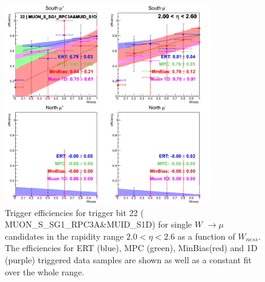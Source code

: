 \begin{figure}[ht]
\begin{center}
\includegraphics[width=0.8\textwidth]{./figures/run13_trigeffisn_eta2_trig22_lin.png}
\caption{\label{fig:run13_trigeffisn_eta2_nper0_trig22_lin} Trigger efficiencies for trigger bit 22 ( MUON\_S\_SG1\_RPC3A\&MUID\_S1D) for single $W$ $\rightarrow \mu$ candidates in the rapidity range $ 2.0 < \eta < 2.6$ as a function of $W_{ness}$. The efficiencies for ERT (blue), MPC (green), MinBias(red) and 1D (purple) triggered data samples are shown as well as a constant fit over the whole range.}
\end{center}

\clearpage

\end{figure}
